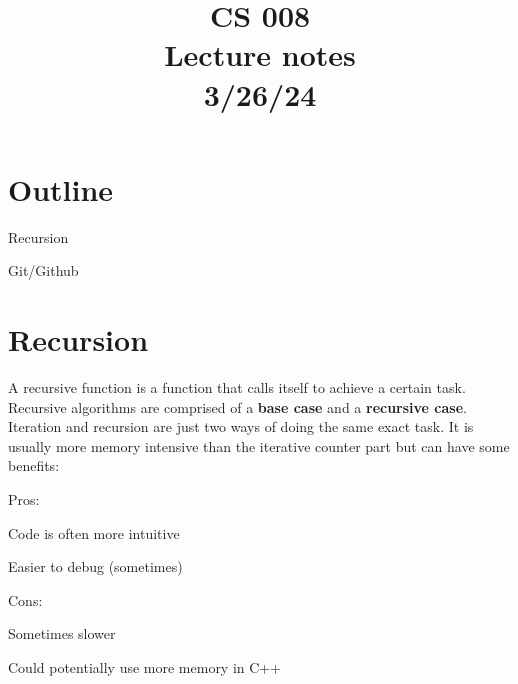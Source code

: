 \documentclass[11pt,a4paper,english]{paper}
\begin{document}
\title{CS 008 \\ Lecture notes \\ 3/26/24}
\maketitle

\section{Outline}

\begin{itemize} {

    \item Recursion
    \item Git/Github

} \end{itemize}

\section{Recursion}

A recursive function is a function that calls itself to achieve a certain task. Recursive algorithms are comprised of a \textbf{base case} and a \textbf{recursive case}. Iteration and recursion are just two ways of doing the same exact task. It is usually more memory intensive than the iterative counter part but can have some benefits:

\bigskip
\begin{gbox}{Pros:} {

    \begin{itemize} {

\item Code is often more intuitive
\item Easier to debug (sometimes)

      }\end{itemize}

  }
\end{gbox}

\begin{mybox}{Cons:} {

  \begin{itemize} {

      \item Sometimes slower
      \item Could potentially use more memory in C++

  }\end{itemize}

}\end{mybox}
\end{document}
